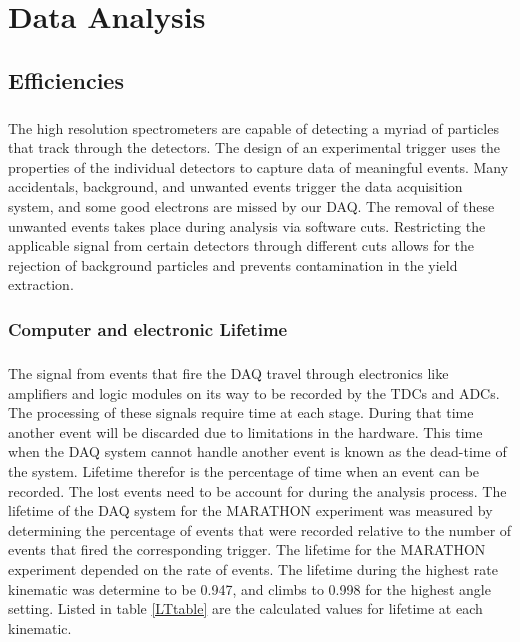 \chapter{Data Analysis}

\section{Efficiencies}
\paragraph{}The high resolution spectrometers are capable of detecting a myriad of particles that track through the detectors. The design of an experimental trigger uses the properties of the individual detectors to capture data of meaningful events. Many accidentals, background, and unwanted events trigger the data acquisition system, and some good electrons are missed by our DAQ. The removal of these unwanted events takes place during analysis via software cuts. Restricting the applicable signal from certain detectors through different cuts allows for the rejection of background particles and prevents contamination in the yield extraction. 

\subsection{Computer and electronic Lifetime}
\paragraph{}The signal from events that fire the DAQ travel through electronics like amplifiers and logic modules on its way to be recorded by the TDCs and ADCs. The processing of these signals require time at each stage. During that time another event will be discarded due to limitations in the hardware. This time when the DAQ system cannot handle another event is known as the dead-time of the system. Lifetime therefor is the percentage of time when an event can be recorded. The lost events need to be account for during the analysis process. The lifetime of the DAQ system for the MARATHON experiment was measured by determining the percentage of events that were recorded relative to the number of events that fired the corresponding trigger. The lifetime for the MARATHON experiment depended on the rate of events. The lifetime during the highest rate kinematic was determine to be 0.947, and climbs to 0.998 for the highest angle setting. Listed in table \ref{LTtable} are the calculated values for lifetime at each kinematic. 

